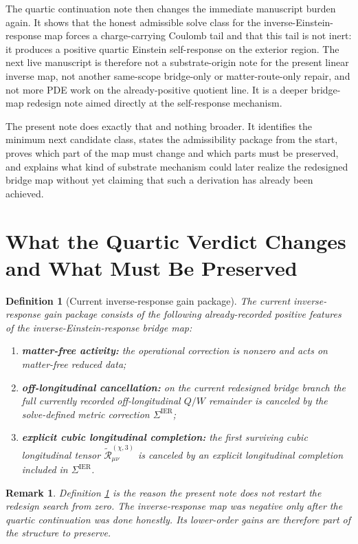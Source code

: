 \documentclass[11pt]{article}
\newcommand{\SigmaIER}{\Sigma^{\mathrm{IER}}}
\newcommand{\ReLongThree}{\widetilde{\mathcal R}_{\mu\nu}^{(\chi,3)}}
\newtheorem{definition}{Definition}
\newtheorem{remark}{Remark}
\begin{document}
The quartic continuation note then changes the immediate manuscript burden again. It shows that the honest admissible solve class for the inverse-Einstein-response map forces a charge-carrying Coulomb tail and that this tail is not inert: it produces a positive quartic Einstein self-response on the exterior region. The next live manuscript is therefore not a substrate-origin note for the present linear inverse map, not another same-scope bridge-only or matter-route-only repair, and not more PDE work on the already-positive quotient line. It is a deeper bridge-map redesign note aimed directly at the self-response mechanism.

The present note does exactly that and nothing broader. It identifies the minimum next candidate class, states the admissibility package from the start, proves which part of the map must change and which parts must be preserved, and explains what kind of substrate mechanism could later realize the redesigned bridge map without yet claiming that such a derivation has already been achieved.

\section{What the Quartic Verdict Changes and What Must Be Preserved}

\begin{definition}[Current inverse-response gain package]
\label{def:gains}
The \emph{current inverse-response gain package} consists of the following already-recorded positive features of the inverse-Einstein-response bridge map:
\begin{enumerate}
    \item \textbf{matter-free activity:} the operational correction is nonzero and acts on matter-free reduced data;
    \item \textbf{off-longitudinal cancellation:} on the current redesigned bridge branch the full currently recorded off-longitudinal \(Q/W\) remainder is canceled by the solve-defined metric correction \(\SigmaIER\);
    \item \textbf{explicit cubic longitudinal completion:} the first surviving cubic longitudinal tensor \(\ReLongThree\) is canceled by an explicit longitudinal completion included in \(\SigmaIER\).
\end{enumerate}
\end{definition}

\begin{remark}
Definition \ref{def:gains} is the reason the present note does not restart the redesign search from zero. The inverse-response map was negative only after the quartic continuation was done honestly. Its lower-order gains are therefore part of the structure to preserve.
\end{remark}
\end{document}
